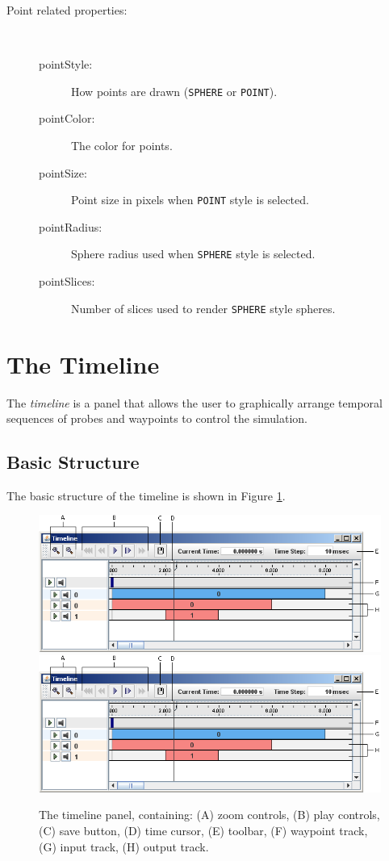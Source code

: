 \documentclass{article}
\begin{document}
\begin{description}
\item[Point related properties:]
\hfil \\
\begin{description}
\item[pointStyle:] 
How points are drawn ({\tt SPHERE} or {\tt POINT}).
\item[pointColor:] 
The color for points.
\item[pointSize:] 
Point size in pixels when {\tt POINT} style is selected.
\item[pointRadius:] 	
Sphere radius used when {\tt SPHERE} style is selected.
\item[pointSlices:] 
Number of slices used to render {\tt SPHERE} style spheres.
\end{description}

\end{description}

\section{The Timeline}
\label{TimelineSec}

The {\it timeline} is a panel that allows the user to graphically
arrange temporal sequences of probes and waypoints to control the
simulation.

\subsection{Basic Structure}

The basic structure of the timeline is shown in 
Figure \ref{timelineFig}.

\begin{figure}
\begin{center}
\iflatexml
\includegraphics[]{images/timeline}
\else
\includegraphics[width=.75\textwidth]{images/timeline}
\fi
\end{center}
\caption{The timeline panel, containing: (A) zoom controls, (B) play
controls, (C) save button, (D) time cursor, (E) toolbar, (F) waypoint
track, (G) input track, (H) output track.}%
\label{timelineFig}
\end{figure}
\end{document}
